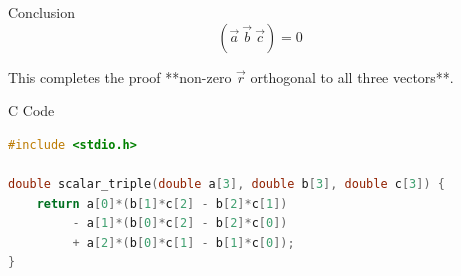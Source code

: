\documentclass{beamer}
\begin{document}
\begin{frame}{Conclusion}
\[
\boxed{(\vec a\ \vec b\ \vec c) = 0}
\]

This completes the proof  **non-zero $\vec r$ orthogonal to all three vectors**.
\end{frame}





\begin{frame}[fragile]{C Code}
\begin{lstlisting}[language=C]
#include <stdio.h>

double scalar_triple(double a[3], double b[3], double c[3]) {
    return a[0]*(b[1]*c[2] - b[2]*c[1])
         - a[1]*(b[0]*c[2] - b[2]*c[0])
         + a[2]*(b[0]*c[1] - b[1]*c[0]);
}
    \end{lstlisting}
\end{frame}
\end{document}
